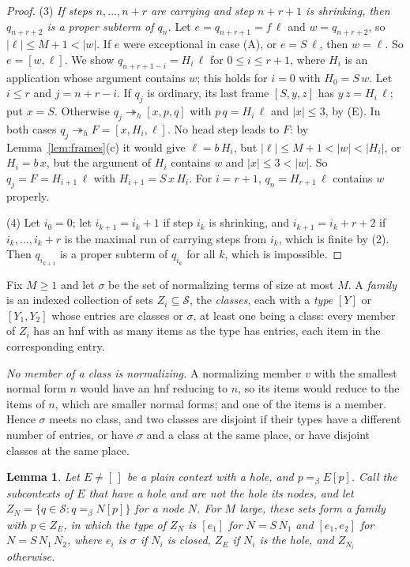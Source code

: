 \documentclass[11pt]{amsart}
\newtheorem{lemma}[theorem]{Lemma}
\newcommand{\Ter}{\mathcal S}
\newcommand{\hred}{\twoheadrightarrow_h}
\newcommand{\conv}{=_\beta}
\newcommand{\sz}[1]{\lvert#1\rvert}
\newcommand{\fr}[1]{[#1]}
\begin{document}
\begin{proof}
(3) \emph{If steps $n,\dots,n+r$ are carrying and step $n+r+1$ is shrinking, then $q_{n+r+2}$ is a
proper subterm of $q_n$.} Let $e=q_{n+r+1}=f\,\ell$ and $w=q_{n+r+2}$, so $\sz\ell\le M+1<\sz w$.
If $e$ were exceptional in case (A), or $e=S\,\ell$, then $w=\ell$. So $e=\fr{w,\ell}$. We show
$q_{n+r+1-i}=H_i\,\ell$ for $0\le i\le r+1$, where $H_i$ is an application whose argument contains
$w$; this holds for $i=0$ with $H_0=S\,w$. Let $i\le r$ and $j=n+r-i$. If $q_j$ is ordinary, its
last frame $\fr{S,y,z}$ has $y\,z=H_i\,\ell$; put $x=S$. Otherwise $q_j\hred\fr{x,p,q}$ with
$p\,q=H_i\,\ell$ and $\sz x\le3$, by (E). In both cases $q_j\hred F=\fr{x,H_i,\ell}$. No head step
leads to $F$: by Lemma~\ref{lem:frames}(c) it would give $\ell=b\,H_i$, but $\sz\ell\le M+1<\sz w<\sz{H_i}$, or $H_i=b\,x$, but the
argument of $H_i$ contains $w$ and $\sz x\le3<\sz w$. So $q_j=F=H_{i+1}\,\ell$ with
$H_{i+1}=S\,x\,H_i$. For $i=r+1$, $q_n=H_{r+1}\,\ell$ contains $w$ properly.

(4) Let $i_0=0$; let $i_{k+1}=i_k+1$ if step $i_k$ is shrinking, and $i_{k+1}=i_k+r+2$ if
$i_k,\dots,i_k+r$ is the maximal run of carrying steps from $i_k$, which is finite by (2). Then
$q_{i_{k+1}}$ is a proper subterm of $q_{i_k}$ for all $k$, which is impossible.
\end{proof}

Fix $M\ge1$ and let $\sigma$ be the set of normalizing terms of size at most $M$. A \emph{family}
is an indexed collection of sets $Z_i\subseteq\Ter$, the \emph{classes}, each with a \emph{type}
$\fr{Y}$ or $\fr{Y_1,Y_2}$ whose entries are classes or $\sigma$, at least one being a class: every
member of $Z_i$ has an hnf with as many items as the type has entries, each item in the
corresponding entry.

\emph{No member of a class is normalizing.} A normalizing member $v$ with the smallest normal form
$n$ would have an hnf reducing to $n$, so its items would reduce to the items of $n$, which are
smaller normal forms; and one of the items is a member. Hence $\sigma$ meets no class, and two classes are disjoint if their types have a different number of entries, or have
$\sigma$ and a class at the same place, or have disjoint classes at the same place.

\begin{lemma}\label{lem:eq}
Let $E\ne[\,]$ be a plain context with a hole, and $p\conv E[p]$. Call the subcontexts of $E$ that
have a hole and are not the hole its \emph{nodes}, and let $Z_N=\{q\in\Ter: q\conv N[p]\}$ for a
node $N$. For $M$ large, these sets form a family with $p\in Z_E$, in which the type of $Z_N$ is
$\fr{e_1}$ for $N=S\,N_1$ and $\fr{e_1,e_2}$ for $N=S\,N_1\,N_2$, where $e_i$ is $\sigma$ if $N_i$ is
closed, $Z_E$ if $N_i$ is the hole, and $Z_{N_i}$ otherwise.
\end{lemma}
\end{document}
